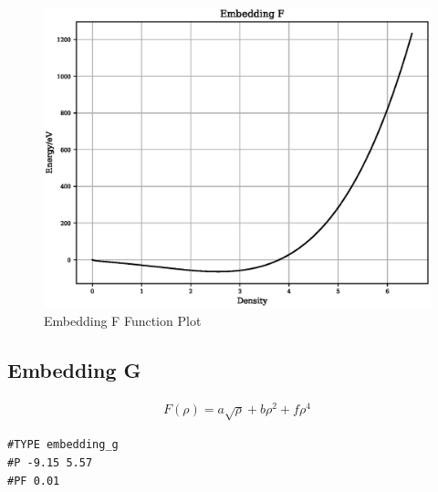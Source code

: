 \FloatBarrier
\begin{figure}[h]
  \begin{center}
    \includegraphics[scale=0.5]{appendix/functions/plots/embedding_f.eps}
    \caption{Embedding F Function Plot}
    \label{graph:embeddingFPlot}
  \end{center}
\end{figure}

\FloatBarrier





\subsection{Embedding G}

\begin{equation}
\begin{split}
F(\rho) = a \sqrt{\rho} + b \rho^2 + f \rho^4
\end{split}
\label{eq:embeddingG}
\end{equation}

\begin{lstlisting}[style=pseudocode,caption={Embedding F}]
#TYPE embedding_g
#P -9.15 5.57
#PF 0.01
\end{lstlisting}

